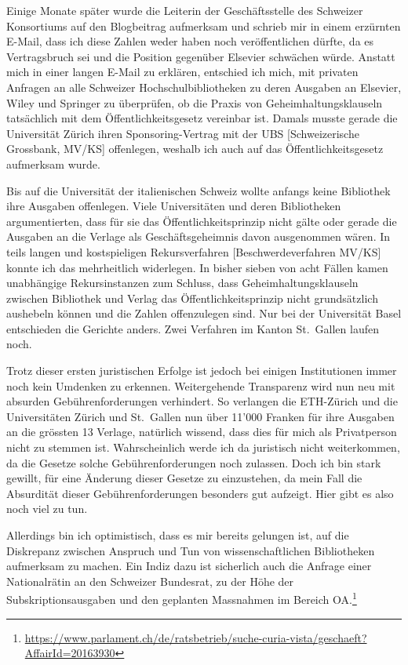 \documentclass[a4paper,
fontsize=11pt,
oneside,
numbers=noperiodatend,
parskip=half-,
bibliography=totoc,
final
]{scrartcl}
\begin{document}
Einige Monate später wurde die Leiterin der Geschäftsstelle des
Schweizer Konsortiums auf den Blogbeitrag aufmerksam und schrieb mir in
einem erzürnten E-Mail, dass ich diese Zahlen weder haben noch
veröffentlichen dürfte, da es Vertragsbruch sei und die Position
gegenüber Elsevier schwächen würde. Anstatt mich in einer langen E-Mail
zu erklären, entschied ich mich, mit privaten Anfragen an alle Schweizer
Hochschulbibliotheken zu deren Ausgaben an Elsevier, Wiley und Springer
zu überprüfen, ob die Praxis von Geheimhaltungsklauseln tatsächlich mit
dem Öffentlichkeitsgesetz vereinbar ist. Damals musste gerade die
Universität Zürich ihren Sponsoring-Vertrag mit der UBS
{[}Schweizerische Grossbank, MV/KS{]} offenlegen, weshalb ich auch auf
das Öffentlichkeitsgesetz aufmerksam wurde.

Bis auf die Universität der italienischen Schweiz wollte anfangs keine
Bibliothek ihre Ausgaben offenlegen. Viele Universitäten und deren
Bibliotheken argumentierten, dass für sie das Öffentlichkeitsprinzip
nicht gälte oder gerade die Ausgaben an die Verlage als
Geschäftsgeheimnis davon ausgenommen wären. In teils langen und
kostspieligen Rekursverfahren {[}Beschwerdeverfahren MV/KS{]} konnte ich
das mehrheitlich widerlegen. In bisher sieben von acht Fällen kamen
unabhängige Rekursinstanzen zum Schluss, dass Geheimhaltungsklauseln
zwischen Bibliothek und Verlag das Öffentlichkeitsprinzip nicht
grundsätzlich aushebeln können und die Zahlen offenzulegen sind. Nur bei
der Universität Basel entschieden die Gerichte anders. Zwei Verfahren im
Kanton St.~Gallen laufen noch.

Trotz dieser ersten juristischen Erfolge ist jedoch bei einigen
Institutionen immer noch kein Umdenken zu erkennen. Weitergehende
Transparenz wird nun neu mit absurden Gebührenforderungen verhindert. So
verlangen die ETH-Zürich und die Universitäten Zürich und St.~Gallen nun
über 11'000 Franken für ihre Ausgaben an die grössten 13 Verlage,
natürlich wissend, dass dies für mich als Privatperson nicht zu stemmen
ist. Wahrscheinlich werde ich da juristisch nicht weiterkommen, da die
Gesetze solche Gebührenforderungen noch zulassen. Doch ich bin stark
gewillt, für eine Änderung dieser Gesetze zu einzustehen, da mein Fall
die Absurdität dieser Gebührenforderungen besonders gut aufzeigt. Hier
gibt es also noch viel zu tun.

Allerdings bin ich optimistisch, dass es mir bereits gelungen ist, auf
die Diskrepanz zwischen Anspruch und Tun von wissenschaftlichen
Bibliotheken aufmerksam zu machen. Ein Indiz dazu ist sicherlich auch
die Anfrage einer Nationalrätin an den Schweizer Bundesrat, zu der Höhe
der Subskriptionsausgaben und den geplanten Massnahmen im Bereich
OA.\footnote{\url{https://www.parlament.ch/de/ratsbetrieb/suche-curia-vista/geschaeft?AffairId=20163930}}
\end{document}
